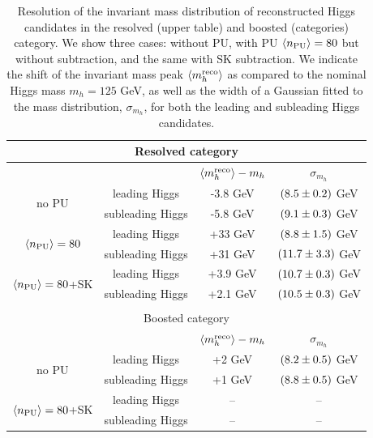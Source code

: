     \begin{table}[h]
      \centering
      \begin{tabular}{|c|c|c|c|}
        \hline
        \multicolumn{4}{|c|}{Resolved category}\\
        \hline
        \hline
        &   &   $\left\langle m_h^{\rm reco}\right\rangle-m_h$  &  $\sigma_{m_h}$  \\
              \hline
        \multirow{2}{*}{no PU}  & leading Higgs  &  -3.8 GeV   & $\left( 8.5\pm 0.2\right)$ GeV   \\
          & subleading Higgs   & -5.8 GeV  &  $\left( 9.1\pm 0.3\right)$ GeV \\
        \hline
          \multirow{2}{*}{$\left\langle n_{\rm PU}\right\rangle=80$}  & leading Higgs  &  +33 GeV   & $\left( 8.8\pm 1.5\right)$ GeV   \\
          & subleading Higgs   & +31 GeV  &  $\left( 11.7\pm 3.3\right)$ GeV \\
          \hline
            \multirow{2}{*}{$\left\langle n_{\rm PU}\right\rangle=80$+SK}  & leading Higgs  &  +3.9 GeV   & $\left( 10.7\pm 0.3\right)$ GeV   \\
          & subleading Higgs   & +2.1 GeV  &  $\left( 10.5\pm 0.3\right)$ GeV \\
            \hline
            \multicolumn{4}{c}{}\\
             \hline
        \multicolumn{4}{|c|}{Boosted category}\\
        \hline
        \hline
        &   &   $\left\langle m_h^{\rm reco}\right\rangle-m_h$  &  $\sigma_{m_h}$  \\
              \hline
        \multirow{2}{*}{no PU}  & leading Higgs  &  +2 GeV   & $\left( 8.2\pm 0.5\right)$ GeV   \\
          & subleading Higgs   & +1 GeV  &  $\left( 8.8\pm 0.5\right)$ GeV \\
        \hline
              \multirow{2}{*}{$\left\langle n_{\rm PU}\right\rangle=80$+SK}  & leading Higgs  &  --   & --   \\
          & subleading Higgs   & --  &  -- \\
        \hline
        \end{tabular}
      \caption{\label{tab:massresolution}
        Resolution of the invariant mass distribution of
        reconstructed Higgs candidates in the resolved (upper table)
        and boosted (categories) category.
        We show three cases: without PU, with PU $\left\langle n_{\rm PU}\right\rangle=80$
        but without subtraction, and the same with SK subtraction.
        We indicate the shift of the invariant
        mass peak $\left\langle m_h^{\rm reco}\right\rangle$ as compared
        to the nominal Higgs mass $m_h=125$ GeV, as well as the width
        of a Gaussian fitted to the mass distribution, $\sigma_{m_h}$,
        for both the leading and subleading Higgs candidates.
      }
      \end{table}




